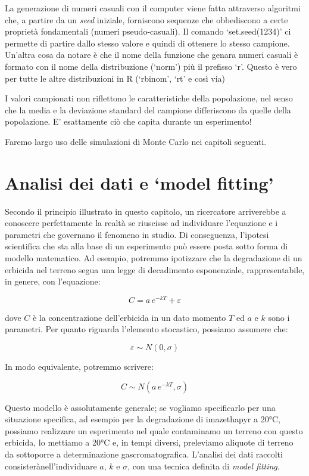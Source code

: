 \documentclass[a4paper,12pt,oneside]{book}
\theoremstyle{definition}
\theoremstyle{definition}
\theoremstyle{definition}
\theoremstyle{remark}
\begin{document}
La generazione di numeri casuali con il computer viene fatta attraverso
algoritmi che, a partire da un \emph{seed} iniziale, forniscono sequenze
che obbediscono a certe proprietà fondamentali (numeri pseudo-casuali).
Il comando `set.seed(1234)' ci permette di partire dallo stesso valore e
quindi di ottenere lo stesso campione. Un'altra cosa da notare è che il
nome della funzione che genara numeri casuali è formato con il nome
della distribuzione (`norm') più il prefisso `r'. Questo è vero per
tutte le altre distribuzioni in R (`rbinom', `rt' e così via)

I valori campionati non riflettono le caratteristiche della popolazione,
nel senso che la media e la deviazione standard del campione
differiscono da quelle della popolazione. E' esattamente ciò che capita
durante un esperimento!

Faremo largo uso delle simulazioni di Monte Carlo nei capitoli seguenti.

\section{\texorpdfstring{Analisi dei dati e `model
fitting'}{Analisi dei dati e model fitting}}\label{analisi-dei-dati-e-model-fitting}

Secondo il principio illustrato in questo capitolo, un ricercatore
arriverebbe a conoscere perfettamente la realtà se riuscisse ad
individuare l'equazione e i parametri che governano il fenomeno in
studio. Di conseguenza, l'ipotesi scientifica che sta alla base di un
esperimento può essere posta sotto forma di modello matematico. Ad
esempio, potremmo ipotizzare che la degradazione di un erbicida nel
terreno segua una legge di decadimento esponenziale, rappresentabile, in
genere, con l'equazione:

\[ C= a \, e^{-k T} + \varepsilon\]

dove \(C\) è la concentrazione dell'erbicida in un dato momento \(T\) ed
\(a\) e \(k\) sono i parametri. Per quanto riguarda l'elemento
stocastico, possiamo assumere che:

\[ \varepsilon \sim N(0, \sigma)\]

In modo equivalente, potremmo scrivere:

\[ C \sim N(a \, e^{-k T}, \sigma)\]

Questo modello è assolutamente generale; se vogliamo specificarlo per
una situazione specifica, ad esempio per la degradazione di imazethapyr
a 20°C, possiamo realizzare un esperimento nel quale contaminamo un
terreno con questo erbicida, lo mettiamo a 20°C e, in tempi diversi,
preleviamo aliquote di terreno da sottoporre a determinazione
gascromatografica. L'analisi dei dati raccolti
consisterànell'individuare \(a\), \(k\) e \(\sigma\), con una tecnica
definita di \emph{model fitting}.
\end{document}

